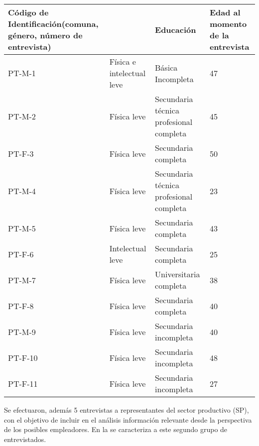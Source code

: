 \begin{table}[!htpb]
\begin{threeparttable}
\begin{tabular}{l>{\raggedright}p{}>{\raggedright}p{}l}
\multicolumn{1}{p{0.2\textwidth}}{Código de Identificación(comuna, género, número de entrevista)} &
\multicolumn{1}{p{0.2\textwidth}}{Situación de Discapacidad} &
Educación & 
\multicolumn{1}{p{0.2\textwidth}}{Edad al momento de la entrevista} \\
\midrule
PT-M-1 & Física e intelectual leve & Básica Incompleta & 47 \\
PT-M-2 & Física leve & Secundaria técnica profesional completa & 45 \\
PT-F-3 & Física leve & Secundaria completa & 50 \\
PT-M-4 & Física leve & Secundaria técnica profesional completa & 23 \\
PT-M-5 & Física leve & Secundaria completa & 43 \\
PT-F-6 & Intelectual leve & Secundaria completa & 25 \\
PT-M-7 & Física leve & Universitaria completa & 38 \\
PT-F-8 & Física leve & Secundaria completa & 40 \\
PT-M-9 & Física leve & Secundaria incompleta & 40 \\
PT-F-10 & Física leve & Secundaria incompleta & 48 \\
PT-F-11 & Física leve & Secundaria incompleta & 27 \\
\bottomrule
\end{tabular}
\end{threeparttable}
\end{table}

Se efectuaron, además 5 entrevistas a representantes del sector
productivo (SP), con el objetivo de incluir en el análisis información
relevante desde la perspectiva de los posibles empleadores. En la  se caracteriza a este segundo grupo de entrevistados.

